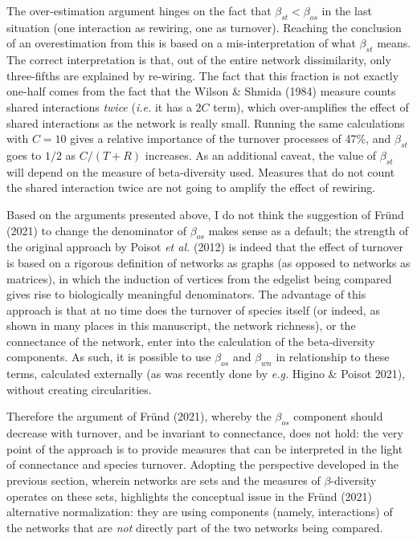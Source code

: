 \documentclass[11pt]{article}
\begin{document}
The over-estimation argument hinges on the fact that
\(\beta_{st} < \beta_{os}\) in the last situation (one interaction as
rewiring, one as turnover). Reaching the conclusion of an overestimation
from this is based on a mis-interpretation of what \(\beta_{st}\) means.
The correct interpretation is that, out of the entire network
dissimilarity, only three-fifths are explained by re-wiring. The fact
that this fraction is not exactly one-half comes from the fact that the
Wilson \& Shmida (1984) measure counts shared interactions \emph{twice}
(\emph{i.e.} it has a \(2C\) term), which over-amplifies the effect of
shared interactions as the network is really small. Running the same
calculations with \(C = 10\) gives a relative importance of the turnover
processes of 47\%, and \(\beta_{st}\) goes to \(1/2\) as \(C/(T+R)\)
increases. As an additional caveat, the value of \(\beta_{st}\) will
depend on the measure of beta-diversity used. Measures that do not count
the shared interaction twice are not going to amplify the effect of
rewiring.

Based on the arguments presented above, I do not think the suggestion of
Fründ (2021) to change the denominator of \(\beta_{os}\) makes sense as
a default; the strength of the original approach by Poisot \emph{et al.}
(2012) is indeed that the effect of turnover is based on a rigorous
definition of networks as graphs (as opposed to networks as matrices),
in which the induction of vertices from the edgelist being compared
gives rise to biologically meaningful denominators. The advantage of
this approach is that at no time does the turnover of species itself (or
indeed, as shown in many places in this manuscript, the network
richness), or the connectance of the network, enter into the calculation
of the beta-diversity components. As such, it is possible to use
\(\beta_{os}\) and \(\beta_{wn}\) in relationship to these terms,
calculated externally (as was recently done by \emph{e.g.} Higino \&
Poisot 2021), without creating circularities.

Therefore the argument of Fründ (2021), whereby the \(\beta_{os}\)
component should decrease with turnover, and be invariant to
connectance, does not hold: the very point of the approach is to provide
measures that can be interpreted in the light of connectance and species
turnover. Adopting the perspective developed in the previous section,
wherein networks are sets and the measures of \(\beta\)-diversity
operates on these sets, highlights the conceptual issue in the Fründ
(2021) alternative normalization: they are using components (namely,
interactions) of the networks that are \emph{not} directly part of the
two networks being compared.
\end{document}
